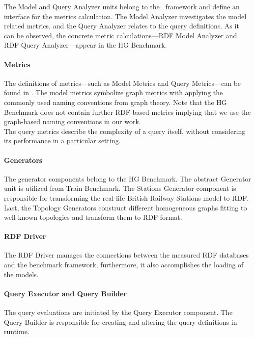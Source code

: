 The \textsf{Model} and \textsf{Query Analyzer} units belong to the \framework~framework and define an interface for the metrics calculation. The \textsf{Model Analyzer} investigates the model related metrics, and the \textsf{Query Analyzer} relates to the query definitions. As it can be observed, the concrete metric calculations---\textsf{RDF Model Analyzer} and \textsf{RDF Query Analyzer}---appear in the HG Benchmark.

\paragraph{Metrics}

The definitions of metrics---such as \textsf{Model Metrics}  and \textsf{Query Metrics}---can be found in \framework. The model metrics symbolize graph metrics with applying the commonly used naming conventions from graph theory. Note that the HG Benchmark does not contain further RDF-based metrics implying that we use the graph-based naming conventions in our work.\\
The query metrics describe the complexity of a query itself, without considering its performance in a particular setting.

\paragraph{Generators}

The generator components belong to the HG Benchmark. The abstract \textsf{Generator} unit is utilized from Train Benchmark. The \textsf{Stations Generator} component is responsible for transforming the real-life British Railway Stations model to RDF. Last, the \textsf{Topology Generators} construct different homogeneous graphs fitting to well-known topologies and transform them to RDF format.

\paragraph{RDF Driver}
The \textsf{RDF Driver} manages the connections between the measured RDF databases and the benchmark framework, furthermore, it also accomplishes the loading of the models. 

\paragraph{Query Executor and Query Builder}

The query evaluations are initiated by the \textsf{Query Executor} component. The \textsf{Query Builder} is responsible for creating and altering the query definitions in runtime.

